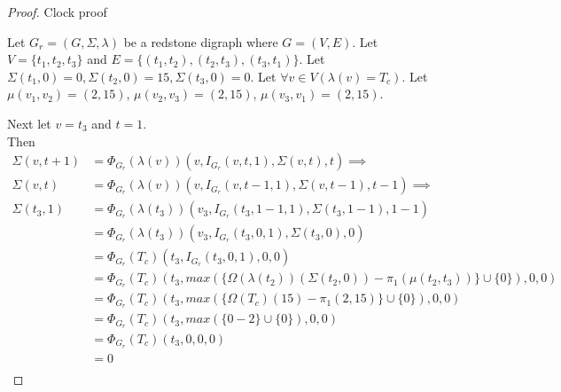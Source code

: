 \documentclass{article}
\begin{document}
\begin{proof} Clock proof
	
	\begin{outline}
		\1 Let \(G_{r} = (G, \Sigma, \lambda)\) be a redstone digraph where \(G = (V, E)\). 
		\1 Let \(V = \{t_{1}, t_{2}, t_{3}\}\) and \(E = \{(t_{1}, t_{2}), (t_{2}, t_{3}), (t_{3}, t_{1})\}\).
		\1 Let \(\Sigma(t_{1}, 0) = 0, \Sigma(t_{2}, 0) = 15, \Sigma(t_{3}, 0) = 0\).
		\1 Let \(\forall v \in V(\lambda(v) = T_{c})\).
		\1 Let \(\mu(v_{1}, v_{2}) = (2, 15)\), \(\mu(v_{2}, v_{3}) = (2, 15)\), \(\mu(v_{3}, v_{1}) = (2, 15)\).
	\end{outline}

	Next let \(v = t_{3}\) and \(t = 1\). \\
	Then
	\begin{align*}
		\Sigma(v, t + 1) &= \Phi_{G_{r}}(\lambda(v))(v, I_{G_{r}}(v, t, 1), \Sigma(v, t), t) \implies \\
		\Sigma(v, t) &= \Phi_{G_{r}}(\lambda(v))(v, I_{G_{r}}(v, t - 1, 1), \Sigma(v, t - 1), t - 1) \implies \\
		\Sigma(t_{3}, 1) &= \Phi_{G_{r}}(\lambda(t_{3}))(v_{3}, I_{G_{r}}(t_{3}, 1 - 1, 1), \Sigma(t_{3}, 1 - 1), 1 - 1)\\
						 &= \Phi_{G_{r}}(\lambda(t_{3}))(v_{3}, I_{G_{r}}(t_{3}, 0, 1), \Sigma(t_{3}, 0), 0) \\
						 &= \Phi_{G_{r}}(T_{c})(t_{3}, I_{G_{r}}(t_{3}, 0, 1), 0, 0) \\
						 &= \Phi_{G_{r}}(T_{c})(t_{3}, max(\{\Omega(\lambda(t_{2}))(\Sigma(t_{2}, 0)) - \pi_{1}(\mu(t_{2}, t_{3}))\} \cup \{0\}), 0, 0) \\
						 &= \Phi_{G_{r}}(T_{c})(t_{3}, max(\{\Omega(T_{c})(15) - \pi_{1}(2, 15)\} \cup \{0\}), 0, 0) \\
						 &= \Phi_{G_{r}}(T_{c})(t_{3}, max(\{0 - 2\} \cup \{0\}), 0, 0) \\
						 &= \Phi_{G_{r}}(T_{c})(t_{3}, 0, 0, 0) \\
						 &= 0 \\
	\end{align*}


\end{proof}
\end{document}

